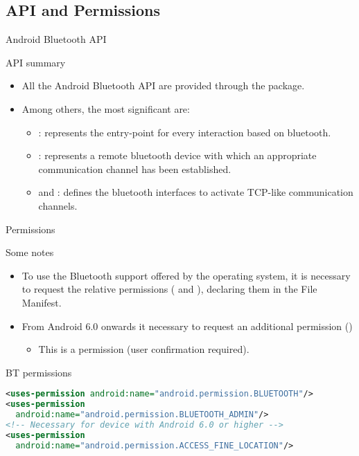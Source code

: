 \documentclass{beamer}
\begin{document}
\subsection{API and Permissions}

  \begin{frame}{Android Bluetooth API}
    \begin{block}{API summary}
      \begin{itemize}\itemsep10pt
        \item All the Android Bluetooth API are provided through the
         package.
        \item Among others, the most significant are:
        \begin{itemize}\itemsep10pt
          \item {}: represents the entry-point for every
          interaction based on bluetooth.
          \item {}: represents a remote bluetooth device with
          which an appropriate communication channel has been established.
          \item {} and : defines the
          bluetooth interfaces to activate TCP-like communication channels. 
        \end{itemize}
      \end{itemize}
    \end{block}
  \end{frame}

  \begin{frame}[fragile]{Permissions}
    \begin{block}{Some notes}
      \begin{itemize}
        \item To use the Bluetooth support offered by the operating system, it is
        necessary to request the relative permissions ( and
        ), declaring them in the File Manifest.
        \item From Android 6.0 onwards it necessary to request an additional permission 
        ()
        \begin{itemize}
          \item This is a  permission (user confirmation
          required). 
        \end{itemize}
      \end{itemize}
    \end{block}

  \begin{exampleblock}{BT permissions}
    \begin{lstlisting}[language=XML]
<uses-permission android:name="android.permission.BLUETOOTH"/>
<uses-permission
  android:name="android.permission.BLUETOOTH_ADMIN"/>
<!-- Necessary for device with Android 6.0 or higher --> 
<uses-permission
  android:name="android.permission.ACCESS_FINE_LOCATION"/>
    \end{lstlisting}
  \end{exampleblock}


\end{frame}
\end{document}
